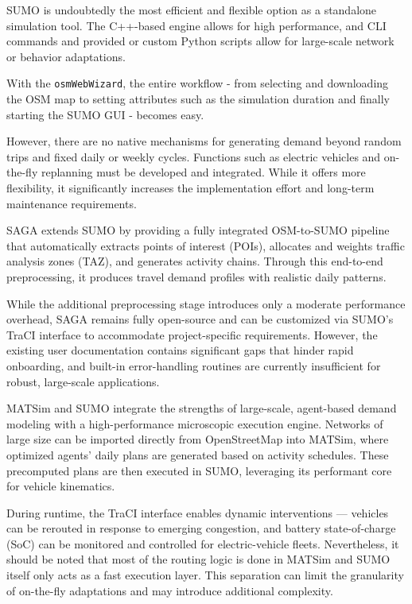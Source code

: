 SUMO is undoubtedly the most efficient and flexible option as a standalone simulation tool. The C++-based engine allows for high performance, and CLI commands and provided or custom Python scripts allow for large-scale network or behavior adaptations.

With the \texttt{osmWebWizard}, the entire workflow - from selecting and downloading the OSM map to setting attributes such as the simulation duration and finally starting the SUMO GUI - becomes easy.

However, there are no native mechanisms for generating demand beyond random trips and fixed daily or weekly cycles. Functions such as electric vehicles and on-the-fly replanning must be developed and integrated. While it offers more flexibility, it significantly increases the implementation effort and long-term maintenance requirements.

SAGA extends SUMO by providing a fully integrated OSM-to-SUMO pipeline that automatically extracts points of interest (POIs), allocates and weights traffic analysis zones (TAZ), and generates activity chains. Through this end-to-end preprocessing, it produces travel demand profiles with realistic daily patterns.

While the additional preprocessing stage introduces only a moderate performance overhead, SAGA remains fully open-source and can be customized via SUMO’s TraCI interface to accommodate project-specific requirements. However, the existing user documentation contains significant gaps that hinder rapid onboarding, and built-in error-handling routines are currently insufficient for robust, large-scale applications.

MATSim and SUMO integrate the strengths of large-scale, agent-based demand modeling with a high-performance microscopic execution engine. Networks of large size can be imported directly from OpenStreetMap into MATSim, where optimized agents’ daily plans are generated based on activity schedules. These precomputed plans are then executed in SUMO, leveraging its performant core for vehicle kinematics.

During runtime, the TraCI interface enables dynamic interventions — vehicles can be rerouted in response to emerging congestion, and battery state-of-charge (SoC) can be monitored and controlled for electric-vehicle fleets. 
Nevertheless, it should be noted that most of the routing logic is done in MATSim and SUMO itself only acts as a fast execution layer. This separation can limit the granularity of on-the-fly adaptations and may introduce additional complexity.

